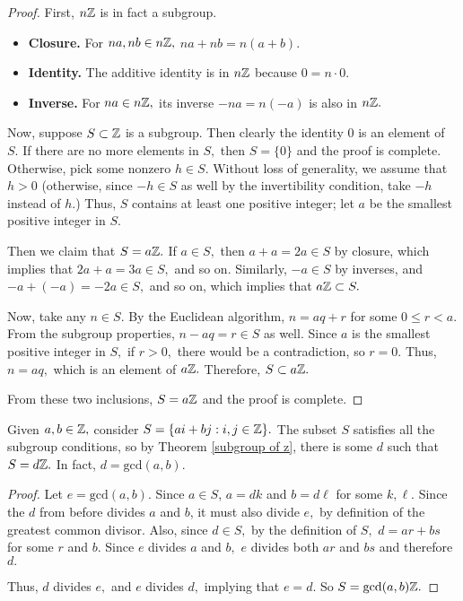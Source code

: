 \begin{proof}
First, $n\mathbb Z$ is in fact a subgroup.
\begin{itemize}
    \item \textbf{Closure.} For $na, nb \in n\mathbb Z,$ $na + nb = n(a + b).$
    \item \textbf{Identity.} The additive identity is in $n\mathbb Z$ because $0 = n \cdot 0.$
    
    \item \textbf{Inverse.} For $na \in n\mathbb Z,$ its inverse $-na = n(-a)$ is also in $n\mathbb Z.$
\end{itemize}

Now, suppose $S \subset \mathbb Z$ is a subgroup. Then clearly the identity $0$ is an element of $S.$ If there are no more elements in $S,$ then $S = \{0\}$ and the proof is complete. Otherwise, pick some nonzero $h \in S.$ Without loss of generality, we assume that $h > 0$ (otherwise, since $-h \in S$ as well by the invertibility condition, take $-h$ instead of $h.$) Thus, $S$ contains at least one positive integer; let $a$ be the smallest positive integer in $S.$ 

Then we claim that $S = a\mathbb Z.$ If $a \in S,$ then $a + a = 2a \in S$ by closure, which implies that $2a + a = 3a \in S,$ and so on. Similarly, $-a \in S$ by inverses, and $-a + (-a) = -2a \in S,$ and so on, which implies that $a \mathbb Z \subset S.$ 

Now, take any $n \in S.$ By the Euclidean algorithm, $n = aq + r$ for some $0 \leq r < a.$ From the subgroup properties, $n - aq  = r\in S$ as well. Since $a$ is the smallest positive integer in $S,$ if $r > 0,$ there would be a contradiction, so $r = 0.$ Thus, $n = aq,$ which is an element of $a\mathbb Z.$ Therefore, $S \subset a\mathbb Z.$ 

From these two inclusions, $S = a\mathbb Z$ and the proof is complete.
\end{proof}

\begin{corollary}
Given $a, b \in \mathbb Z,$ consider $S = \{ai + bj: i, j \in \mathbb Z\}.$ The subset $S$ satisfies all the subgroup conditions, so by Theorem \ref{subgroup of z}, there is some $d$ such that $S = d\mathbb Z.$ In fact, $d = \text{gcd}(a, b).$
\end{corollary}
\begin{proof}
Let $e = \text{gcd}(a, b).$ Since $a \in S$, $a = dk$ and $b = d\ell$ for some $k, \ell.$ Since the $d$ from before divides $a$ and $b$, it must also divide $e,$ by definition of the greatest common divisor. Also, since $d \in S,$ by the definition of $S,$ $d = ar + bs$ for some $r$ and $b.$ Since $e$ divides $a$ and $b,$ $e$ divides both $ar$ and $bs$ and therefore $d.$ 

Thus, $d$ divides $e,$ and $e$ divides $d,$ implying that $e = d.$ So $S = \text{gcd}(a, b) \mathbb Z.$
\end{proof}
 
